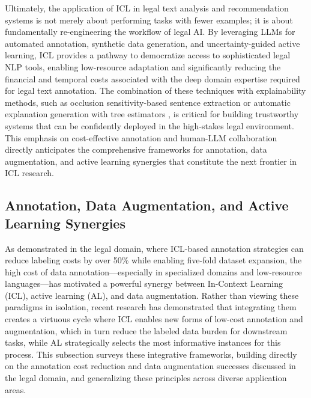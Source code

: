 \documentclass[11pt]{article}
\begin{document}
Ultimately, the application of ICL in legal text analysis and recommendation systems is not merely about performing tasks with fewer examples; it is about fundamentally re-engineering the workflow of legal AI. By leveraging LLMs for automated annotation, synthetic data generation, and uncertainty-guided active learning, ICL provides a pathway to democratize access to sophisticated legal NLP tools, enabling low-resource adaptation and significantly reducing the financial and temporal costs associated with the deep domain expertise required for legal text annotation. The combination of these techniques with explainability methods, such as occlusion sensitivity-based sentence extraction \cite{ref568} or automatic explanation generation with tree estimators \cite{ref581}, is critical for building trustworthy systems that can be confidently deployed in the high-stakes legal environment. This emphasis on cost-effective annotation and human-LLM collaboration directly anticipates the comprehensive frameworks for annotation, data augmentation, and active learning synergies that constitute the next frontier in ICL research.

\subsection{Annotation, Data Augmentation, and Active Learning Synergies}

As demonstrated in the legal domain, where ICL-based annotation strategies can reduce labeling costs by over 50\% while enabling five-fold dataset expansion, the high cost of data annotation---especially in specialized domains and low-resource languages---has motivated a powerful synergy between In-Context Learning (ICL), active learning (AL), and data augmentation. Rather than viewing these paradigms in isolation, recent research has demonstrated that integrating them creates a virtuous cycle where ICL enables new forms of low-cost annotation and augmentation, which in turn reduce the labeled data burden for downstream tasks, while AL strategically selects the most informative instances for this process. This subsection surveys these integrative frameworks, building directly on the annotation cost reduction and data augmentation successes discussed in the legal domain, and generalizing these principles across diverse application areas.
\end{document}
